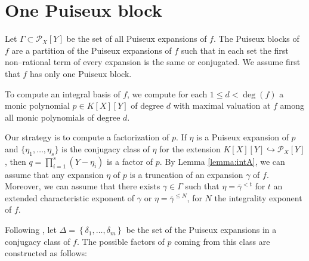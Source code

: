 \documentclass[a4paper,11pt]{amsart}%
\theoremstyle{definition}
\theoremstyle{plain}
\theoremstyle{remark}
\newcommand{\Px}{{\mathcal{P}_X}}
\begin{document}
\section{One Puiseux block}

Let $\Gamma \subset \Px[Y]$ be the set of all Puiseux expansions of $f$. The Puiseux blocks of $f$ are a partition of the Puiseux expansions of $f$ such that in each set the first non--rational term of every expansion is the same or conjugated. We assume first that $f$ has only one Puiseux block.

To compute an integral basis of $f$, we compute for each $1 \le d < \deg(f)$ a monic polynomial $p \in K[X][Y]$ of degree $d$ with maximal valuation at $f$ among all monic polynomials of degree $d$.

Our strategy is to compute a factorization of $p$. If $\eta$ is a Puiseux expansion of $p$ and $\{\eta_1, \dots, \eta_s\}$ is the conjugacy class of $\eta$ for the extension $K[X][Y] \hookrightarrow \Px[Y]$, then $q = \prod_{i = 1}^s (Y - \eta_i)$ is a factor of $p$.
By Lemma \ref{lemma:intA}, we can assume that any expansion $\eta$ of $p$ is a truncation of an expansion $\gamma$ of $f$. Moreover, we can assume that there exists $\gamma \in \Gamma$ such that $\eta = \overline{\gamma}^{<t}$ for $t$ an extended characteristic exponent of $\gamma$ or $\eta = \overline{\gamma}^{\le N}$, for $N$ the integrality exponent of $f$.

%

Following \cite[Algorithm 6]{intbas}, let $\Delta=\left\{  \delta_{1},\ldots,\delta_{m}\right\}$ be
the set of the Puiseux expansions in a conjugacy class of $f$. The possible factors of $p$ coming from this class are constructed as follows:
\end{document}
